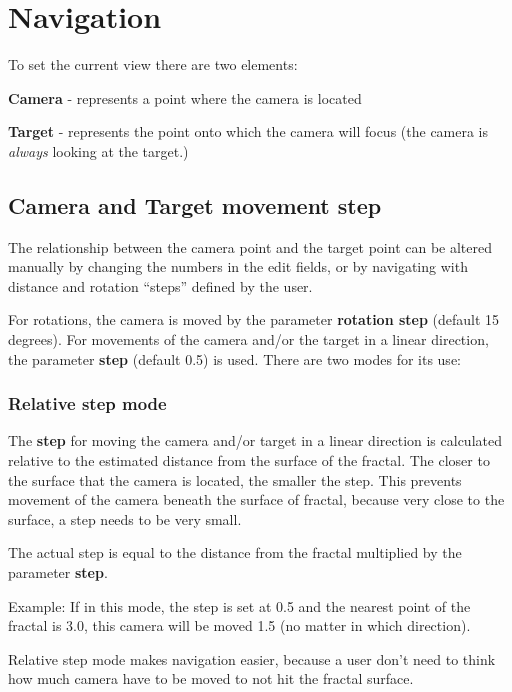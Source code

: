 \section{Navigation}\label{navigation}

To set the current view there are two elements:

\textbf{Camera} - represents a point where the camera is located

\textbf{Target} - represents the point onto which the camera will focus (the
camera is \emph{always} looking at the target.)

\subsection{Camera and Target movement
	step}\label{camera-and-target-movement-step}

The relationship between the camera point and the target point can be altered
manually by changing the numbers in the edit fields, or by navigating with
distance and rotation ``steps'' defined by the user.

For rotations, the camera is moved by the parameter \textbf{rotation step}
(default 15 degrees). For movements of the camera and/or the target in a linear
direction, the parameter \textbf{step} (default 0.5) is used. There are two
modes for its use:

\subsubsection{Relative step mode}\label{relative-step-mode}

The \textbf{step} for moving the camera and/or target in a linear direction is
calculated relative to the estimated distance from the surface of the fractal.
The closer to the surface that the camera is located, the smaller the step. This
prevents movement of the camera beneath the surface of fractal, because very
close to the surface, a step needs to be very small.

The actual step is equal to the distance from the fractal multiplied by the
parameter \textbf{step}.

Example: If in this mode, the step is set at 0.5 and the nearest point of the
fractal is 3.0, this camera will be moved 1.5 (no matter in which direction).

Relative step mode makes navigation easier, because a user don't need to think
how much camera have to be moved to not hit the fractal surface.

